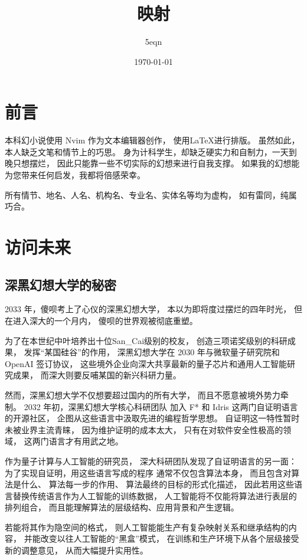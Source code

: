 \documentclass[UTF8,a4paper,11pt]{ctexart}
\title{映射}
\author{5eqn}
\date{\today}
\newcommand{\p}{傻呗} %
\newcommand{\X}{深黑幻想大学} %
\newcommand{\x}{深大} %
\newcommand{\y}{某国} %
\newcommand{\z}{San\_Cai} %
\begin{document}
  \maketitle
  \section{前言}
    本科幻小说使用 Nvim 作为文本编辑器创作，
    使用\LaTeX 进行排版。
    虽然如此，本人缺乏文笔和情节上的巧思。
    身为计科学生，却缺乏硬实力和自制力，一天到晚只想摆烂，
    因此只能靠一些不切实际的幻想来进行自我支撑。
    如果我的幻想能为您带来任何启发，我都将倍感荣幸。

    所有情节、地名、人名、机构名、专业名、实体名等均为虚构，
    如有雷同，纯属巧合。
  \section{访问未来}
    \subsection{\X 的秘密}
      2033 年，\p 考上了心仪的\X ，
      本以为即将度过摆烂的四年时光，
      但在进入\x 的一个月内，
      \p 的世界观被彻底重塑。

      为了在本世纪中叶培养出十位\z 级别的校友，
      创造三项诺奖级别的科研成果，
      发挥“\y 硅谷”的作用，
      \X 在 2030 年与微软量子研究院和
      OpenAI 签订协议，
      这些境外企业向\x 共享最新的量子芯片和通用人工智能研究成果，
      而\x 则要反哺\y 的新兴科研力量。

      然而，\X 不仅想要超过国内的所有大学，
      而且不愿意被境外势力牵制。
      2032 年初，\X 核心科研团队
      加入 F* 和 Idris 这两门自证明语言的开源社区，
      企图从这些语言中汲取先进的编程哲学思想。
      自证明这一特性暂时未被业界主流青睐，
      因为维护证明的成本太大，
      只有在对软件安全性极高的领域，
      这两门语言才有用武之地。

      作为量子计算与人工智能的研究员，
      \x 科研团队发现了自证明语言的另一面：
      为了实现自证明，用这些语言写成的程序
      通常不仅包含算法本身，
      而且包含对算法是什么、
      算法每一步的作用、
      算法最终的目标的形式化描述，
      因此若用这些语言替换传统语言作为人工智能的训练数据，
      人工智能将不仅能将算法进行表层的排列组合，
      而且能理解算法的层级结构、应用背景和产生逻辑。

      若能将其作为隐空间的格式，
      则人工智能能生产有复杂映射关系和继承结构的内容，
      并能改变以往人工智能的“黑盒”模式，
      在训练和生产环境下从各个层级接受新的调整意见，
      从而大幅提升实用性。
\end{document}
